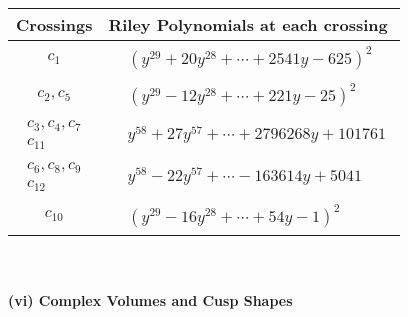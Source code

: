 \documentclass[1p]{elsarticle_modified}
\theoremstyle{definition}
\begin{document}
\begin{tabular}{m{50pt}|m{274pt}}
Crossings & \hspace{64pt}Riley Polynomials at each crossing \\
\hline $$\begin{aligned}c_{1}\end{aligned}$$&$\begin{aligned}
&(y^{29}+20 y^{28}+\cdots+2541 y-625)^{2}
\end{aligned}$\\
\hline $$\begin{aligned}c_{2},c_{5}\end{aligned}$$&$\begin{aligned}
&(y^{29}-12 y^{28}+\cdots+221 y-25)^{2}
\end{aligned}$\\
\hline $$\begin{aligned}c_{3},c_{4},c_{7}\\c_{11}\end{aligned}$$&$\begin{aligned}
&y^{58}+27 y^{57}+\cdots+2796268 y+101761
\end{aligned}$\\
\hline $$\begin{aligned}c_{6},c_{8},c_{9}\\c_{12}\end{aligned}$$&$\begin{aligned}
&y^{58}-22 y^{57}+\cdots-163614 y+5041
\end{aligned}$\\
\hline $$\begin{aligned}c_{10}\end{aligned}$$&$\begin{aligned}
&(y^{29}-16 y^{28}+\cdots+54 y-1)^{2}
\end{aligned}$\\
\hline
\end{tabular}\\~\\
\newpage\flushleft \textbf{(vi) Complex Volumes and Cusp Shapes}
\end{document}
